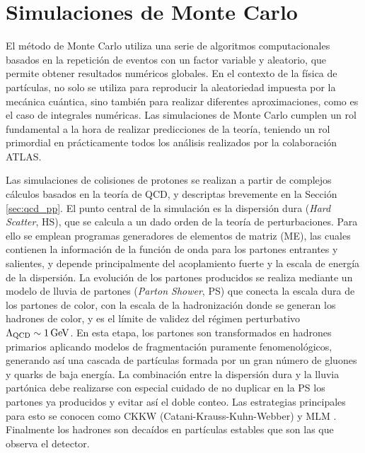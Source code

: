

\section{Simulaciones de Monte Carlo}


El método de Monte Carlo utiliza una serie de algoritmos computacionales basados en la repetición de eventos con un factor variable y aleatorio, que permite obtener resultados numéricos globales.
En el contexto de la física de partículas, no solo se utiliza para reproducir la aleatoriedad impuesta por la mecánica cuántica, sino también para realizar diferentes aproximaciones, como es el caso de integrales numéricas.
Las simulaciones de Monte Carlo cumplen un rol fundamental a la hora de realizar predicciones de la teoría, teniendo un rol primordial en prácticamente todos los análisis realizados por la colaboración ATLAS. 

Las simulaciones de colisiones de protones se realizan a partir de complejos cálculos basados en la teoría de QCD, y descriptas brevemente en la Sección \ref{sec:qcd_pp}. 
El punto central de la simulación es la dispersión dura (\textit{Hard Scatter}, HS), que se calcula a un dado orden de la teoría de perturbaciones. Para ello se emplean programas generadores de elementos de matriz (ME), las cuales contienen la información de la función de onda para los partones entrantes y salientes, y depende principalmente del acoplamiento
fuerte y la escala de energía de la dispersión. La evolución de los partones producidos se realiza mediante un modelo de lluvia de partones (\textit{Parton Shower}, PS) que conecta la escala dura de los partones de color, con la escala de la hadronización donde se generan los hadrones de color, y es el límite de validez del régimen perturbativo $\Lambda_{\text{QCD}}\sim 1\,\text{GeV}$. En esta etapa, los partones son transformados en hadrones primarios aplicando modelos de fragmentación puramente fenomenológicos, generando así una cascada de partículas formada por un gran número de gluones y quarks de baja energía. La combinación entre la dispersión dura y la lluvia partónica debe realizarse
con especial cuidado de no duplicar en la PS los partones ya producidos y evitar
así el doble conteo. Las estrategias principales para esto se conocen como CKKW
(Catani-Krauss-Kuhn-Webber) \cite{Catani_2001, Krauss_2002} y MLM \cite{Mangano_2003}. Finalmente los hadrones son decaídos en partículas estables que son las que observa el detector.

